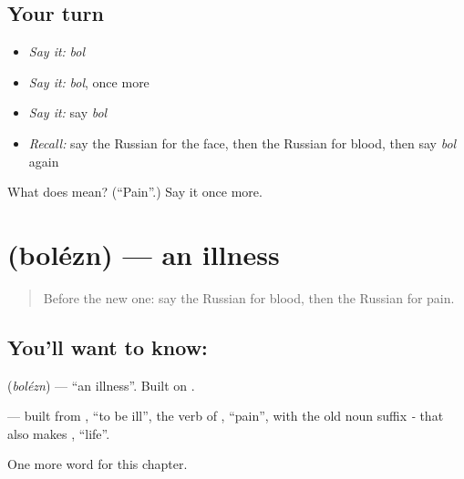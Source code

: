 \subsection*{Your turn}
\begin{itemize}
\raggedright
  \item \emph{Say it:} \emph{bol}
  \item \emph{Say it:} \emph{bol}, once more
  \item \emph{Say it:} say \emph{bol}
  \item \emph{Recall:} say the Russian for the face, then the Russian for blood, then say \emph{bol} again
\end{itemize}

\begin{tcolorbox}[breakable,colback=teal!4,colframe=teal!35!black,title={Before you move on}]
What does  mean? (\textquotedblleft{}Pain\textquotedblright{}.) Say it once more.
\end{tcolorbox}
\section[\texorpdfstring{\ru{болезнь} (bolézn)}{болезнь (bolézn)}]{ (bolézn) — an illness}

\label{lesson:RU-C32-illness}



\begin{quote}
Before the new one: say the Russian for blood, then the Russian for pain.
\end{quote}

\subsection*{You'll want to know: }
\textbf{} (\emph{bolézn}) — \textquotedblleft{}an illness\textquotedblright{}. Built on \textbf{}.

\begin{cousinweb}
\textbf{} — built from \emph{}, \textquotedblleft{}to be ill\textquotedblright{}, the verb of \emph{}, \textquotedblleft{}pain\textquotedblright{}, with the old noun suffix \emph{-} that also makes \emph{}, \textquotedblleft{}life\textquotedblright{}.
\end{cousinweb}

\begin{grammarlens}[title={What you've built}]
One more word for this chapter.
\end{grammarlens}

